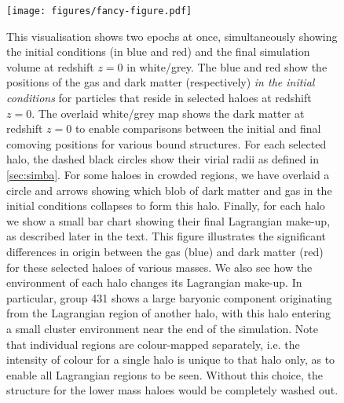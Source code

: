 \begin{figure}
	\centering
	\vspace{0.5cm}
	\texttt{[image: figures/fancy-figure.pdf]}
 \caption{ This visualisation shows two epochs at once, simultaneously
 showing the initial conditions (in blue and red) and the final simulation
 volume at redshift $z=0$ in white/grey. The blue and red show the positions
 of the gas and dark matter (respectively) \emph{in the initial conditions}
 for particles that reside in selected haloes at redshift $z=0$. The overlaid
 white/grey map shows the dark matter at redshift $z=0$ to enable comparisons
 between the initial and final comoving positions for various bound
 structures. For each selected halo, the dashed black circles show their
 virial radii as defined in \ref{sec:simba}. For some haloes in crowded
 regions, we have overlaid a circle and arrows showing which blob of dark
 matter and gas in the initial conditions collapses to form this halo.
 Finally, for each halo we show a small bar chart showing their final
 Lagrangian make-up, as described later in the text. This figure illustrates
 the significant differences in origin between the gas (blue) and dark matter
 (red) for these selected haloes of various masses. We also see how the
 environment of each halo changes its Lagrangian make-up. In particular,
 group 431 shows a large baryonic component originating from the Lagrangian
 region of another halo, with this halo entering a small cluster environment
 near the end of the simulation. Note that individual regions are
 colour-mapped separately, i.e. the intensity of colour for a single halo is
 unique to that halo only, as to enable all Lagrangian regions to be seen.
 Without this choice, the structure for the lower mass haloes would be
 completely washed out.}
	\vspace{1cm}
	\label{fig:bigtransferpic}
\end{figure}


